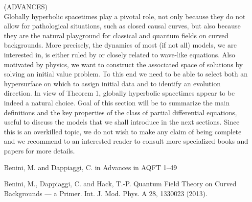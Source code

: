 \documentclass[a4paper,12pt]{scrartcl}    %
\begin{document}
		\begin{Warning}
		(ADVANCES)\\
		Globally hyperbolic spacetimes play a pivotal role, not only because they do not allow for pathological situations, such as closed causal curves, but also because they are the natural playground for classical and quantum fields on curved backgrounds. More precisely, the dynamics of most (if not all) models, we are interested in, is either ruled by or closely related to wave-like equations. Also motivated by physics, we want to construct the associated space of solutions by solving an initial value problem. To this end we need to be able to select both an hypersurface on which to assign initial data and to identify an evolution direction. In view of Theorem 1, globally hyperbolic spacetimes appear to be indeed a natural choice. Goal of this section will be to summarize the main definitions and the key properties of the class of partial differential equations, useful to discuss the models that we shall introduce in the next sections. Since this is an overkilled topic, we do not wish to make any claim of being complete and we recommend to an interested reader to consult more specialized books and papers for more details.
		\end{Warning}
		
\begin{thebibliography}{100}

 Benini, M. and Dappiaggi, C. in Advances in AQFT 1–49

 Benini, M., Dappiaggi, C. and Hack, T.-P. Quantum Field Theory on Curved Backgrounds — a Primer. Int. J. Mod. Phys. A 28, 1330023 (2013).

\end{thebibliography}		
\end{document}
